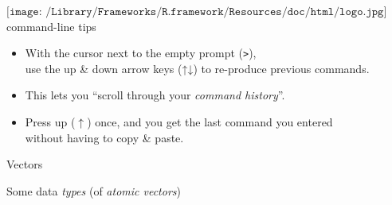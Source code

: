 \documentclass[
  ignorenonframetext,
]{beamer}
\newcommand{\AlertTok}[1]{\textcolor[rgb]{0.94,0.16,0.16}{#1}}
\newcommand{\OtherTok}[1]{\textcolor[rgb]{0.56,0.35,0.01}{#1}}
\begin{document}
\begin{frame}{\(\texttt{[image: /Library/Frameworks/R.framework/Resources/doc/html/logo.jpg]}\)
command-line tips}
\protect\hypertarget{includegraphicsheight1emlibraryframeworksr.frameworkresourcesdochtmllogo.jpg-command-line-tips}{}
\begin{itemize}
\item
  With the cursor next to the empty prompt (\OtherTok{\texttt{>}}),\\
  use the up \& down \AlertTok{arrow keys} (↑↓) to re-produce previous
  commands.
\item
  This lets you ``scroll through your \emph{command history}''.
\item
  Press \AlertTok{up} (\AlertTok{$\uparrow$}) once, and you get the last
  command you entered\\
  without having to copy \& paste.
\end{itemize}
\end{frame}

\begin{frame}{Vectors}
\protect\hypertarget{vectors}{}
\end{frame}

\begin{frame}{Some data \emph{types} (of \emph{atomic vectors})}
\protect\hypertarget{some-data-types-of-atomic-vectors}{}
\end{frame}
\end{document}
